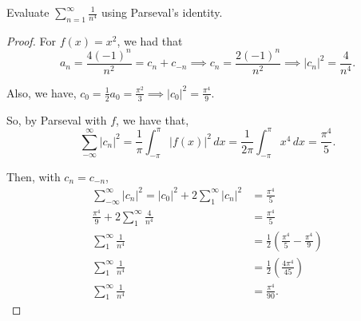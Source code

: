 \documentclass[../hw6]{subfiles}
\begin{document}
\begin{problem}
Evaluate $\sum_{n=1}^{\infty} \frac{1}{n^4}$ using Parseval's identity.
\end{problem}
\begin{proof}
	For $f(x)=x^2$, we had that \[
		a_n = \frac{4(-1)^n}{n^2} = c_n + c_{-n} \implies c_n = \frac{2(-1)^n}{n^2} \implies |c_n|^2 = \frac{4}{n^4}
		.\]

	Also, we have, $c_0=\frac{1}{2}a_0=\frac{\pi^2}{3} \implies |c_0|^2=\frac{\pi^4}{9}$.

	So, by Parseval with $f$, we have that, \[
		\sum_{-\infty}^{\infty} |c_n|^2
		=\frac{1}{\pi}\int_{-\pi}^{\pi} |f(x)|^2 \,dx
		=\frac{1}{2\pi}\int_{-\pi}^{\pi} x^4 \,dx
		= \frac{\pi^4}{5}
		.\]

	Then, with $c_n=c_{-n}$,
	\begin{align*}
		\sum_{-\infty}^{\infty}|c_n|^2= |c_0|^2+2 \sum_{1}^{\infty} |c_n|^2 & = \frac{\pi^4}{5}                                           \\
		\frac{\pi^4}{9} + 2 \sum_{1}^{\infty} \frac{4}{n^4}                 & = \frac{\pi^4}{5}                                           \\
		\sum_{1}^{\infty} \frac{1}{n^4}                                     & = \frac{1}{2}\left( \frac{\pi^4}{5}-\frac{\pi^4}{9} \right) \\
		\sum_{1}^{\infty} \frac{1}{n^4}                                     & = \frac{1}{2}\left( \frac{4\pi^4}{45} \right)               \\
		\sum_{1}^{\infty} \frac{1}{n^4}                                     & = \frac{\pi^4}{90}
		.\end{align*}
\end{proof}
\end{document}
